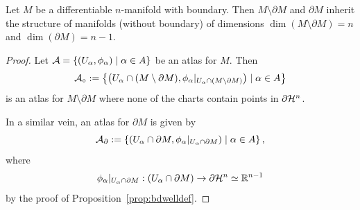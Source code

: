 \begin{proposition}
  Let $M$ be a differentiable $n$-manifold with boundary.
  Then $M\setminus\partial M$ and $\partial M$ inherit the structure of manifolds (without boundary) of dimensions $\dim(M\setminus\partial M)=n$ and $\dim(\partial M) = n-1$.
\end{proposition}
\begin{proof}
  Let $\mathcal{A} = \{(U_\alpha,\phi_\alpha) \mid \alpha\in A\}$ be an atlas for $M$. 
  Then
  \begin{equation}
    \mathcal{A}_\circ := \left\{
      \left(
        U_\alpha \cap (M\setminus\partial M),
        \phi_\alpha|_{U_\alpha \cap (M\setminus\partial M)}
        \right) \mid \alpha\in A
      \right\}
  \end{equation}
  is an atlas for $M\setminus\partial M$ where none of the charts contain points in $\partial\mathcal{H}^n$.

  In a similar vein, an atlas for $\partial M$ is given by
  \begin{equation}
    \mathcal{A}_\partial := \left\{
      \left(
        U_\alpha \cap \partial M,
        \phi_\alpha|_{U_\alpha \cap \partial M}
        \right) \mid \alpha\in A
      \right\},
  \end{equation}
  where
  \begin{equation}
    \phi_\alpha|_{U_\alpha \cap \partial M} : (U_\alpha \cap \partial M) \to \partial\mathcal{H}^n\simeq\mathbb{R}^{n-1}
  \end{equation}
  by the proof of Proposition~\ref{prop:bdwelldef}.
\end{proof}

